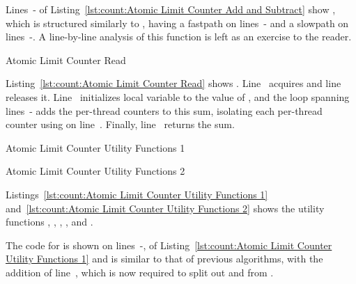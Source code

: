 \begin{lineref}
Lines~- of
Listing~\ref{lst:count:Atomic Limit Counter Add and Subtract}
show , which is structured similarly to
, having a fastpath on
lines~- and a slowpath on
lines~-.
A line-by-line analysis of this function is left as an exercise to
the reader.
\end{lineref}

\begin{listing}[tbp]

\caption{Atomic Limit Counter Read}
\label{lst:count:Atomic Limit Counter Read}
\end{listing}

\begin{lineref}
Listing~\ref{lst:count:Atomic Limit Counter Read} shows .
Line~ acquires  and
line~ releases it.
Line~ initializes local variable  to the value of
, and the loop spanning
lines~- adds the
per-thread counters to this sum, isolating each per-thread counter
using  on line~.
Finally, line~ returns the sum.
\end{lineref}

\begin{listing}[tbp]

\caption{Atomic Limit Counter Utility Functions 1}
\label{lst:count:Atomic Limit Counter Utility Functions 1}
\end{listing}

\begin{listing}[tb]

\caption{Atomic Limit Counter Utility Functions 2}
\label{lst:count:Atomic Limit Counter Utility Functions 2}
\end{listing}

Listings~\ref{lst:count:Atomic Limit Counter Utility Functions 1}
and~\ref{lst:count:Atomic Limit Counter Utility Functions 2}
shows the utility functions
,
,
,
, and
.
\begin{lineref}
The code for  is shown on
lines~-,
of Listing~\ref{lst:count:Atomic Limit Counter Utility Functions 1} and
is similar to that of previous algorithms, with the addition of
line~, which is now required to split out  and
 from .
\end{lineref}

